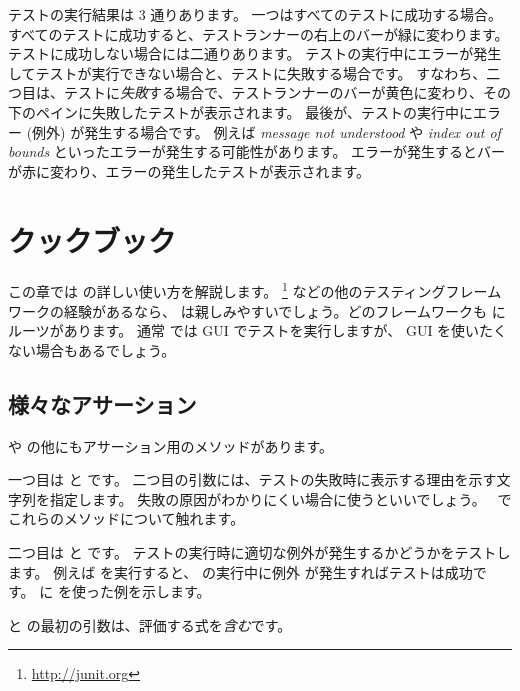 \documentclass[a4paper,10pt,twoside]{book}
\begin{document}
テストの実行結果は 3 通りあります。
一つはすべてのテストに成功する場合。
すべてのテストに成功すると、{テストランナー}の右上のバーが緑に変わります。
テストに成功しない場合には二通りあります。
テストの実行中にエラーが発生してテストが実行できない場合と、テストに失敗する場合です。
すなわち、二つ目は、テストに\emph{失敗}する場合で、{テストランナー}のバーが黄色に変わり、その下のペインに失敗したテストが表示されます。
最後が、テストの実行中にエラー (例外) が発生する場合です。
例えば \emph{message not understood} や \emph{index out of bounds} といったエラーが発生する可能性があります。
エラーが発生するとバーが赤に変わり、エラーの発生したテストが表示されます。


\section{\SUnit クックブック}

この章では \SUnit の詳しい使い方を解説します。
\JUnit\footnote{\url{http://junit.org}} などの他のテスティングフレームワークの経験があるなら、 \SUnit は親しみやすいでしょう。どのフレームワークも \SUnit にルーツがあります。
通常 \SUnit では GUI でテストを実行しますが、 GUI を使いたくない場合もあるでしょう。

\subsection{様々なアサーション}

 や  の他にもアサーション用のメソッドがあります。

一つ目は  と  です。
二つ目の引数には、テストの失敗時に表示する理由を示す文字列を指定します。
失敗の原因がわかりにくい場合に使うといいでしょう。
~でこれらのメソッドについて触れます。

二つ目は  と  です。
テストの実行時に適切な例外が発生するかどうかをテストします。
例えば  を実行すると、  の実行中に例外  が発生すればテストは成功です。
 に \mbox{} を使った例を示します。


 と  の最初の引数は、評価する式を\emph{含む}です。
\end{document}
